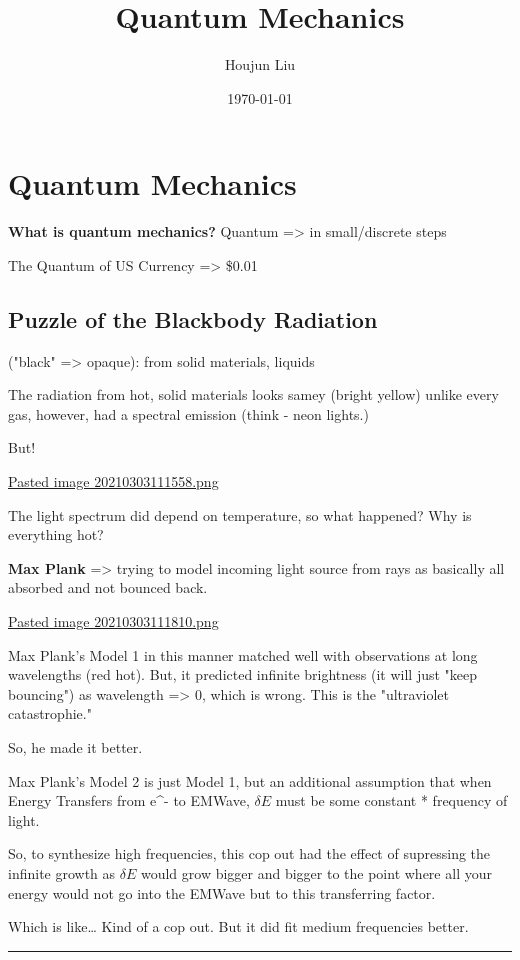 \documentclass[letterpaper]{article}
\author{Houjun Liu}
\date{\today}
\title{Quantum Mechanics}
\renewcommand{\tableofcontents}{}
\begin{document}
\tableofcontents



\section{Quantum Mechanics}
\label{sec:orga55b9e8}
\textbf{What is quantum mechanics?} Quantum => in small/discrete steps

The Quantum of US Currency => \$0.01

\subsection{Puzzle of the Blackbody Radiation}
\label{sec:orgaa0fee5}
("black" => opaque): from solid materials, liquids

The radiation from hot, solid materials looks samey (bright yellow)
unlike every gas, however, had a spectral emission (think - neon
lights.)

But!

\href{Pasted image 20210303111558.png.org}{Pasted image
20210303111558.png}

The light spectrum did depend on temperature, so what happened? Why is
everything hot?

\textbf{Max Plank} => trying to model incoming light source from rays as
basically all absorbed and not bounced back.

\href{Pasted image 20210303111810.png.org}{Pasted image
20210303111810.png}

Max Plank's Model 1 in this manner matched well with observations at
long wavelengths (red hot). But, it predicted infinite brightness (it
will just "keep bouncing") as wavelength => 0, which is wrong. This is
the "ultraviolet catastrophie."

So, he made it better.

Max Plank's Model 2 is just Model 1, but an additional assumption that
when Energy Transfers from e\^{}- to EMWave, \(\delta E\) must be some
constant * frequency of light.

So, to synthesize high frequencies, this cop out had the effect of
supressing the infinite growth as \(\delta E\) would grow bigger and
bigger to the point where all your energy would not go into the EMWave
but to this transferring factor.

Which is like\ldots{} Kind of a cop out. But it did fit medium frequencies
better.

\noindent\rule{\textwidth}{0.5pt}
\end{document}
